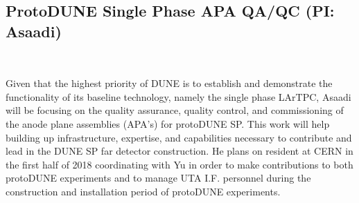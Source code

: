 \subsection{ProtoDUNE Single Phase APA QA/QC (PI: Asaadi)}~\label{sec:proto-dune-sp-apa}

Given that the highest priority of DUNE is to establish and demonstrate the functionality of its baseline technology, namely the single phase LArTPC, Asaadi will be focusing on the quality assurance, quality control, and commissioning of the anode plane assemblies (APA's) for protoDUNE SP. This work will help building up infrastructure, expertise, and capabilities necessary to contribute and lead in the DUNE SP far detector construction.  He plans on resident at CERN in the first half of 2018 coordinating with Yu in order to make contributions to both protoDUNE experiments and to manage UTA I.F. personnel during the construction and installation period of protoDUNE experiments. 
